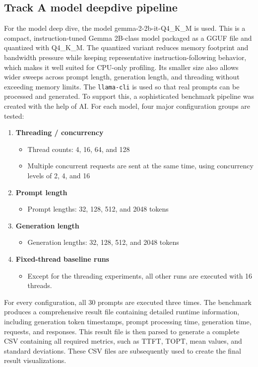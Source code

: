 \documentclass[11pt,a4paper]{article}
\begin{document}
\subsection{Track A model deepdive pipeline}
For the model deep dive, the model gemma-2-2b-it-Q4\_K\_M is used. This is a compact, instruction-tuned Gemma 2B-class model packaged as a GGUF file and quantized with Q4\_K\_M.
The quantized variant reduces memory footprint and bandwidth pressure while keeping representative instruction-following behavior, which makes it well suited for CPU-only profiling.
Its smaller size also allows wider sweeps across prompt length, generation length, and threading without exceeding memory limits.
The \texttt{llama-cli} is used so that real prompts can be processed and generated. To support this, a sophisticated benchmark pipeline was created with the help of AI.
For each model, four major configuration groups are tested:
\begin{enumerate}
    \item \textbf{Threading / concurrency}
    \begin{itemize}
        \item Thread counts: 4, 16, 64, and 128
        \item Multiple concurrent requests are sent at the same time, using concurrency levels of 2, 4, and 16
    \end{itemize}

    \item \textbf{Prompt length}
    \begin{itemize}
        \item Prompt lengths: 32, 128, 512, and 2048 tokens
    \end{itemize}

    \item \textbf{Generation length}
    \begin{itemize}
        \item Generation lengths: 32, 128, 512, and 2048 tokens
    \end{itemize}

    \item \textbf{Fixed-thread baseline runs}
    \begin{itemize}
        \item Except for the threading experiments, all other runs are executed with 16 threads.
    \end{itemize}
\end{enumerate}
For every configuration, all 30 prompts are executed three times. The benchmark produces a comprehensive result file containing detailed runtime information, including generation token timestamps, prompt processing time, generation time, requests, and responses.
This result file is then parsed to generate a complete CSV containing all required metrics, such as TTFT, TOPT, mean values, and standard deviations. These CSV files are subsequently used to create the final result visualizations.
\end{document}
